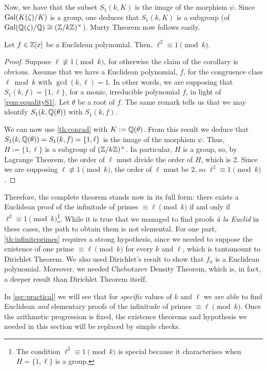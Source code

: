\documentclass[../main.tex]{subfiles}
\begin{document}
Now, we have that the subset $S_1(k,K)$ is the image of the morphism $\psi$. Since $\operatorname{Gal}(K(\zeta)/K)$ is a group, one deduces that $S_1(k,K)$ is a subgroup (of $\operatorname{Gal}(\mathbb{Q}(\zeta)/\mathbb{Q})\cong(\mathbb{Z}/k\mathbb{Z})^\times$). Murty Theorem now follows easily.
\begin{corollary}
	Let $f \in \mathbb{Z}[x]$ be a Euclidean polynomial. Then, $\ell^2 \equiv 1 \pmod{k}$.
\end{corollary}
\begin{proof}	
	Suppose $\ell\not\equiv 1 \pmod{k}$, for otherwise the claim of the corollary is obvious. Assume that we have a Euclidean polynomial, $f$, for the congruence class $\ell \bmod{k}$ with $\gcd(k, \ell)=1$. In other words, we are supposing that $S_1(k, f)=\{1, \ell\}$, for a monic, irreducible polynomial $f$, in light of \cref{rem:equalityS1}. Let $\theta$ be a root of $f$. The same remark tells us that we may identify $S_1(k,\mathbb{Q}(\theta))$ with $S_1(k,f)$.
	
	We can now use \cref{th:conrad} with $K:=\mathbb{Q}(\theta)$. From this result we deduce that $S_1(k,\mathbb{Q}(\theta))=S_1(k,f)=\{1, \ell\}$ is the image of the morphism $\psi$. Thus, $H:=\{1, \ell\}$ is a subgroup of $(\mathbb{Z}/k\mathbb{Z})^\times$. In particular, $H$ is a group, so, by Lagrange Theorem, the order of $\ell$ must divide the order of $H$, which is $2$. Since we are supposing $\ell\not\equiv 1 \pmod{k}$, the order of $\ell$ must be $2$, so $\ell^2\equiv 1\pmod{k}$.
\end{proof}

Therefore, the complete theorem stands now in its full form: there exists a Euclidean proof of the infinitude of primes $\equiv \ell \pmod{k}$ if and only if $\ell^2\equiv 1 \pmod{k}$\footnote{The condition $\ell^2\equiv 1 \pmod{k}$ is special because it characterises when $H=\{1, \ell\}$ is a group.}. While it is true that we managed to find proofs \textit{à la Euclid} in these cases, the path to obtain them is not elemental. For one part, \cref{th:infiniteprimes} requires a strong hypothesis, since we needed to suppose the existence of one prime $\equiv \ell\pmod{k}$ for every $k$ and $\ell$, which is tantamount to Dirichlet Theorem. We also used Dirichlet's result to show that $f_u$ is a Euclidean polynomial. Moreover, we needed Chebotarev Density Theorem, which is, in fact, a deeper result than Dirichlet Theorem itself.

In \cref{sec:practical} we will see that for \emph{specific} values of $k$ and $\ell$ we are able to find Euclidean \emph{and} elementary proofs of the infinitude of primes $\equiv \ell\pmod{k}$. Once the arithmetic progression is fixed, the existence theorems and hypothesis we needed in this section will be replaced by simple checks.
\end{document}
